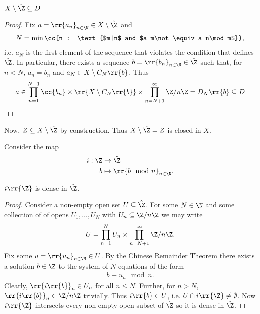 \documentclass{article}
\begin{document}
\begin{claim*}
  $X\setminus\hat\Z\subseteq D$
  \begin{proof}
    Fix $a=\rr{a_n}_{n\in\N}\in X\setminus\hat\Z$ and
    \begin{align*}
      N=\min\cc{n : \text{$m|n$ and $a_m\not\equiv a_n\mod m$}},
    \end{align*}
    i.e. $a_N$ is the first element of the sequence that violates the condition that defines $\hat\Z$.
    In particular, there exists a sequence $b=\rr{b_n}_{n\in\N}\in\hat\Z$ such that,
    for $n<N$, $a_n=b_n$ and $a_N\in X\setminus C_N\rr{b}$. Thus
    \begin{align*}
      a\in \prod_{n=1}^{N-1} \cc{b_n} \times \rr{X\setminus C_N\rr{b}} \times \prod_{n=N+1}^\infty \Z/n\Z= D_N\rr{b}\subseteq D
    \end{align*}
  \end{proof}
\end{claim*}

Now, $Z\subseteq X\setminus\hat\Z$ by construction. Thus $X\setminus\hat\Z=Z$ is closed
in $X$.

Consider the map
\begin{align*}
  i:\Z&\to\hat\Z \\
  b&\mapsto  \rr{b \mod n}_{n\in\N}.
\end{align*}

\begin{claim*}
  $i\rr{\Z}$ is dense in $\hat\Z$.
  \begin{proof}
    Consider a non-empty open set $U\subseteq\hat\Z$. For some $N\in\N$ and some collection of
    of opens $U_1,\ldots,U_N$ with $U_n\subseteq \Z/n\Z$ we may write
    \begin{align*}
      U = \prod_{n=1}^{N}U_n \times \prod_{n=N+1}^\infty \Z/n\Z.
    \end{align*}
    Fix some $u=\rr{u_n}_{n\in\N}\in U$. By the Chinese Remainder Theorem there exists a
    solution $b\in\Z$ to the system of $N$ equations of the form
    \begin{align*}
      b \equiv u_n \mod n.
    \end{align*}
    Clearly, $\rr{i\rr{b}}_{n}\in U_n$ for all $n\leq N$. Further, for $n>N$, $\rr{i\rr{b}}_n\in\Z/n\Z$
    trivially. Thus $i\rr{b}\in U$, i.e. $U\cap i\rr{\Z}\neq\emptyset$. Now $i\rr{\Z}$ intersects
    every non-empty open subset of $\hat\Z$ so it is dense in $\hat\Z$.
  \end{proof}
\end{claim*}
\end{document}
